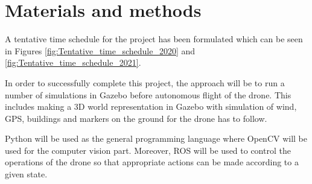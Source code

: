 \documentclass[../Head/Report.tex]{subfiles}
\begin{document}
\section{Materials and methods}

A tentative time schedule for the project has been formulated which can be seen in Figures \ref{fig:Tentative_time_schedule_2020} and \ref{fig:Tentative_time_schedule_2021}. 

In order to successfully complete this project, the approach will be to run a number of simulations in Gazebo before autonomous flight of the drone. This includes making a 3D world representation in Gazebo with simulation of wind, GPS, buildings and markers on the ground for the drone has to follow.     

Python will be used as the general programming language where OpenCV will be used for the computer vision part. Moreover, ROS will be used to control the operations of the drone so that appropriate actions can be made according to a given state.    

%
\newcommand{\myWeek}{\themyWeekNum
    \stepcounter{myWeekNum}
    \ifnum\themyWeekNum=53
         \setcounter{myWeekNum}{1}
    \else\fi
}
\end{document}
